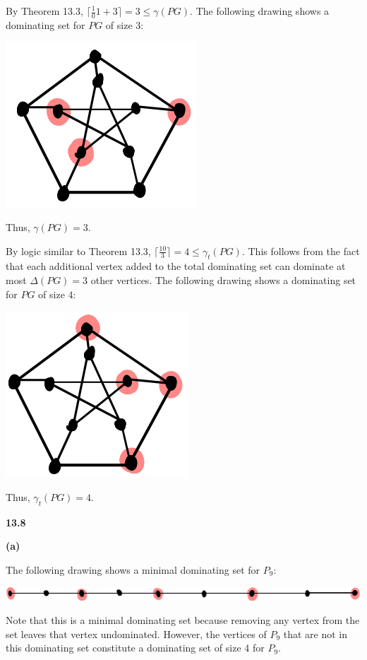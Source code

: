 \documentclass[12pt]{article}
\begin{document}
    By Theorem 13.3, $\lceil \frac 10{1+3} \rceil = 3 \leq \gamma(PG)$.
    The following drawing shows a dominating set for $PG$ of size $3$:
    \begin{center} \includegraphics[scale=.7]{8.png} \end{center}
    Thus, $\gamma(PG) = 3$.

    By logic similar to Theorem 13.3, $\lceil \frac{10}{3} \rceil = 4 \leq \gamma_t(PG)$.
    This follows from the fact that each additional vertex added to the total dominating set can dominate at most $\Delta(PG) = 3$ other vertices.
    The following drawing shows a dominating set for $PG$ of size $4$:
    \begin{center} \includegraphics[scale=.7]{9.png} \end{center}
    Thus, $\gamma_t(PG) = 4$.

\newpage\noindent\textbf{13.8}

\medskip\noindent\textbf{(a)}

    The following drawing shows a minimal dominating set for $P_9$:
    \begin{center} \includegraphics[scale=.4]{10.png} \end{center}
    Note that this is a minimal dominating set because removing any vertex from the set leaves that vertex undominated.
    However, the vertices of $P_9$ that are not in this dominating set constitute a dominating set of size 4 for $P_9$.
\end{document}
